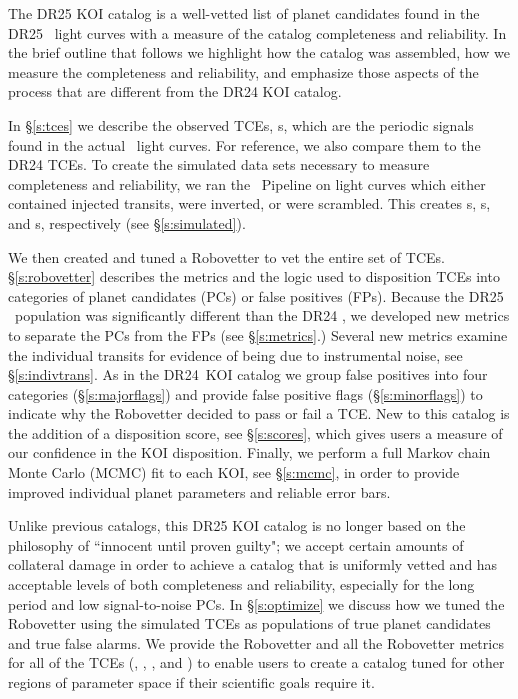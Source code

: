 The DR25 KOI catalog is a well-vetted list of planet candidates found in the DR25 \Kepler\ light curves with a measure of the catalog completeness and reliability. In the brief outline that follows we highlight how the catalog was assembled, how we measure the completeness and reliability, and emphasize those aspects of the process that are different from the DR24 KOI catalog.

In \S\ref{s:tces} we describe the observed TCEs, \opstce s, which are the periodic signals found in the actual \Kepler\ light curves. For reference, we also compare them to the DR24 TCEs. To create the simulated data sets necessary to measure completeness and reliability, we ran the \Kepler\ Pipeline on light curves which either contained injected transits, were inverted, or were scrambled. This creates \injtce s, \invtce s, and \scrtce s, respectively (see \S\ref{s:simulated}).  

We then created and tuned a Robovetter to vet the entire set of TCEs. \S\ref{s:robovetter} describes the metrics and the logic used to disposition TCEs into categories of planet candidates (PCs) or false positives (FPs).  Because the DR25 \opstce\ population was significantly different than the DR24 , we developed new metrics to separate the PCs from the FPs (see \S\ref{s:metrics}.) Several new metrics examine the individual transits for evidence of being due to instrumental noise, see \S\ref{s:indivtrans}. As in the DR24~KOI catalog we group false positives into four categories (\S\ref{s:majorflags}) and provide false positive flags (\S\ref{s:minorflags}) to indicate why the Robovetter decided to pass or fail a TCE.  New to this catalog is the addition of a disposition score, see \S\ref{s:scores}, which gives users a measure of our confidence in the KOI disposition. Finally, we perform a full Markov chain Monte Carlo (MCMC) fit to each KOI, see \S\ref{s:mcmc}, in order to provide improved individual planet parameters and reliable error bars.


Unlike previous catalogs, this DR25 KOI catalog is no longer based on the philosophy of ``innocent until proven guilty"; we accept certain amounts of collateral damage in order to achieve a catalog that is uniformly vetted and has acceptable levels of both completeness and reliability, especially for the long period and low signal-to-noise PCs. In \S\ref{s:optimize} we discuss how we tuned the Robovetter using the simulated TCEs as populations of true planet candidates and true false alarms. We provide the Robovetter and all the Robovetter metrics for all of the TCEs (\opstce, \injtce, \invtce, and \scrtce) to enable users to create a catalog tuned for other regions of parameter space if their scientific goals require it. 

